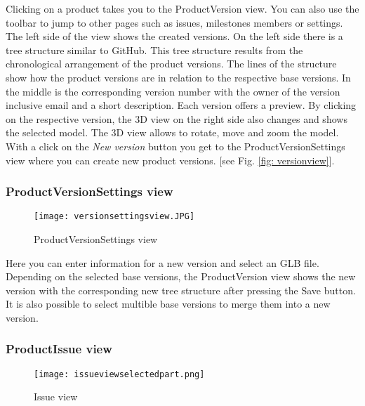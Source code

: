 Clicking on a product takes you to the ProductVersion view. You can also use the toolbar to jump to other pages such as issues, milestones members or settings. The left side of the view shows the created versions. On the left side there is a tree structure similar to GitHub. This tree structure results from the chronological arrangement of the product versions. The lines of the structure show how the product versions are in relation to the respective base versions. In the middle is the corresponding version number with the owner of the version inclusive email and a short description. Each version offers a preview. By clicking on the respective version, the 3D view on the right side also changes and shows the selected model. The 3D view allows to rotate, move and zoom the model. 
With a click on the \textit{New version} button you get to the ProductVersionSettings view where you can create new product versions. [see Fig. \ref{fig: versionview}]. 

\subsubsection{ProductVersionSettings view}

\begin{wrapfigure}{r}{0.5\textwidth}
    \centering
    \texttt{[image: versionsettingsview.JPG]}
    \caption{ProductVersionSettings view}
    \label{fig: versionsettingsview}
\end{wrapfigure}

Here you can enter information for a new version and select an GLB file. Depending on the selected base versions, the ProductVersion view shows the new version with the corresponding new tree structure after pressing the Save button. It is also possible to select multible base versions to merge them into a new version.

\subsubsection{ProductIssue view}

\begin{wrapfigure}{r}{0.5\textwidth}
    \centering
    \texttt{[image: issueviewselectedpart.png]}
    \caption{Issue view}
    \label{fig: issueview}
\end{wrapfigure}

